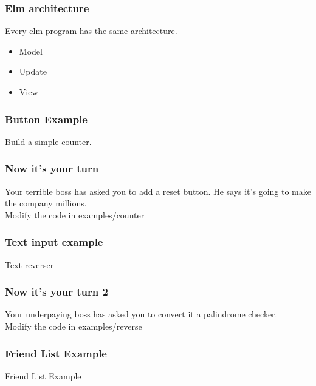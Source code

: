 \documentclass[aspectratio=1610]{beamer}
\begin{document}
\begin{frame}
\frametitle{Elm architecture}
     Every elm program has the same architecture.
    \begin{itemize}
      \item Model
      \item Update
      \item View
    \end{itemize}
\end{frame}

\begin{frame}

\frametitle{Button Example}

\begin{center}
     \Huge Build a simple counter.
\end{center}

\end{frame}

\begin{frame}

\frametitle{Now it's your turn}

Your terrible boss has asked you to add a reset button.
He says it's going to make the company millions.
\\
\vspace{1cm}
Modify the code in examples/counter

\end{frame}

\begin{frame}

\frametitle{Text input example}

\begin{center}
     \Huge Text reverser
\end{center}

\end{frame}

\begin{frame}

\frametitle{Now it's your turn 2}
Your underpaying boss has asked you to convert it a palindrome checker.
\\
\vspace{1cm}
Modify the code in examples/reverse
\end{frame}
\begin{frame}

\frametitle{Friend List Example}

\begin{center}
     \Huge Friend List Example
\end{center}

\end{frame}
\end{document}
